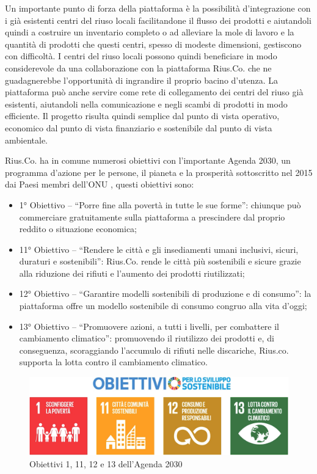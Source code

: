 Un importante punto di forza della piattaforma è la possibilità d'integrazione con i già esistenti centri del riuso locali facilitandone il flusso dei prodotti e aiutandoli quindi a costruire un inventario completo o ad alleviare la mole di lavoro e la quantità di prodotti che questi centri, spesso di modeste dimensioni, gestiscono con difficoltà. I centri del riuso locali possono quindi beneficiare in modo considerevole da una collaborazione con la piattaforma Rius.Co. che ne guadagnerebbe l'opportunità di ingrandire il proprio bacino d'utenza. 
La piattaforma può anche servire come rete di collegamento dei centri del riuso già esistenti, aiutandoli nella comunicazione e negli scambi di prodotti in modo efficiente. Il progetto risulta quindi semplice dal punto di vista operativo, economico dal punto di vista finanziario e sostenibile dal punto di vista ambientale. 
\medskip

Rius.Co. ha in comune numerosi obiettivi con l'importante Agenda 2030, un programma d'azione per le persone, il pianeta e la prosperità sottoscritto nel 2015 dai Paesi membri dell'ONU \cite{Agenda2030}, questi obiettivi sono: 
\begin{itemize}
    \item 1° Obiettivo – “Porre fine alla povertà in tutte le sue forme”: chiunque può commerciare gratuitamente sulla piattaforma a prescindere dal proprio reddito o situazione economica; 
    \item 11° Obiettivo – “Rendere le città e gli insediamenti umani inclusivi, sicuri, duraturi e sostenibili”: Rius.Co. rende le città più sostenibili e sicure grazie alla riduzione dei rifiuti e l'aumento dei prodotti riutilizzati; 
    \item 12° Obiettivo – “Garantire modelli sostenibili di produzione e di consumo”: la piattaforma offre un modello sostenibile di consumo congruo alla vita d'oggi; 
    \item 13° Obiettivo – “Promuovere azioni, a tutti i livelli, per combattere il cambiamento climatico”: promuovendo il riutilizzo dei prodotti e, di conseguenza, scoraggiando l'accumulo di rifiuti nelle discariche, Rius.co. supporta la lotta contro il cambiamento climatico. 
\end{itemize}
\begin{figure}[hb]
    \centering\includegraphics[scale=0.1]{images/agenda_2030.png}
    \caption{Obiettivi 1, 11, 12 e 13 dell'Agenda 2030}
\end{figure}
\clearpage
